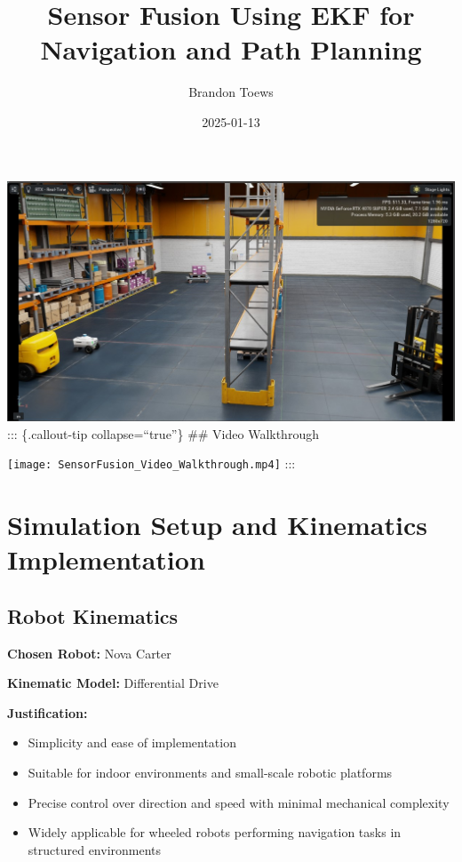 \documentclass[
  letterpaper,
  DIV=11,
  numbers=noendperiod]{scrartcl}
\title{Sensor Fusion Using EKF for Navigation and Path Planning}
\author{Brandon Toews}
\date{2025-01-13}
\providecommand{\tightlist}{%
  \setlength{\itemsep}{0pt}\setlength{\parskip}{0pt}}\usepackage{longtable,booktabs,array}
\renewcommand*\contentsname{Table of contents}
\newcommand\contentsname{Table of contents}
\begin{document}
\maketitle
\ifdefined\Shaded\renewenvironment{Shaded}{\begin{tcolorbox}[sharp corners, borderline west={3pt}{0pt}{shadecolor}, frame hidden, breakable, boxrule=0pt, interior hidden, enhanced]}{\end{tcolorbox}}\fi

\renewcommand*\contentsname{Table of contents}
{
\hypersetup{linkcolor=}
\setcounter{tocdepth}{3}
\tableofcontents
}
\includegraphics{3rd-person-view.png} ::: \{.callout-tip
collapse=``true''\} \#\# Video Walkthrough

\texttt{[image: SensorFusion\_Video\_Walkthrough.mp4]} :::

\hypertarget{simulation-setup-and-kinematics-implementation}{%
\section{Simulation Setup and Kinematics
Implementation}\label{simulation-setup-and-kinematics-implementation}}

\hypertarget{robot-kinematics}{%
\subsection{Robot Kinematics}\label{robot-kinematics}}

\textbf{Chosen Robot:} Nova Carter

\textbf{Kinematic Model:} Differential Drive

\textbf{Justification:}

\begin{itemize}
\tightlist
\item
  Simplicity and ease of implementation
\item
  Suitable for indoor environments and small-scale robotic platforms
\item
  Precise control over direction and speed with minimal mechanical
  complexity
\item
  Widely applicable for wheeled robots performing navigation tasks in
  structured environments
\end{itemize}
\end{document}
